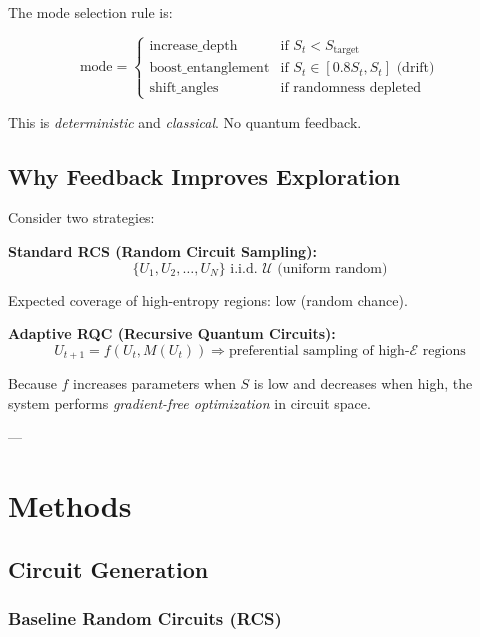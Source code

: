 \documentclass[twocolumn]{article}
\begin{document}
The mode selection rule is:

\begin{equation}
\text{mode} = \begin{cases}
\text{increase\_depth} & \text{if } S_t < S_{\text{target}} \\
\text{boost\_entanglement} & \text{if } S_t \in [0.8 S_t, S_t] \text{ (drift)} \\
\text{shift\_angles} & \text{if randomness depleted}
\end{cases}
\end{equation}

This is \textit{deterministic} and \textit{classical}. No quantum feedback.

\subsection{Why Feedback Improves Exploration}

Consider two strategies:

\textbf{Standard RCS (Random Circuit Sampling):}
\begin{equation}
\{U_1, U_2, \ldots, U_N\} \text{ i.i.d. } \mathcal{U} \text{ (uniform random)}
\end{equation}

Expected coverage of high-entropy regions: low (random chance).

\textbf{Adaptive RQC (Recursive Quantum Circuits):}
\begin{equation}
U_{t+1} = f(U_t, M(U_t)) \Rightarrow \text{preferential sampling of high-$\mathcal{E}$ regions}
\end{equation}

Because $f$ increases parameters when $S$ is low and decreases when high, the system performs \textit{gradient-free optimization} in circuit space.

---

\section{Methods}

\subsection{Circuit Generation}

\subsubsection{Baseline Random Circuits (RCS)}
\end{document}
